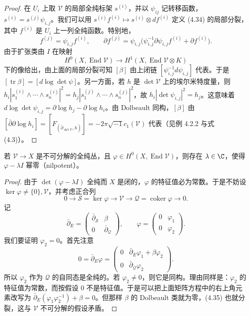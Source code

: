 \begin{proof}
在 $U_i$ 上取 $\mathcal{V}$ 的局部全纯标架 $s^{(i)}$，并以 $\psi_{ij}$ 记转移函数，$s^{(i)}=s^{(j)}\psi_{i,j}$。我们可以用 $s^{(i)}f^{(i)}\mapsto s^{(i)}\otimes df^{(i)}$ 定义 (4.34) 的局部分裂，其中 $f^{(i)}$ 是 $U_i$ 上一列全纯函数。特别地，
\[
f^{(j)}=\psi_{i,j}f^{(i)},\qquad
\partial f^{(j)}=\psi_{i,j}\bigl(\psi^{-1}_{i,j}\partial\psi_{i,j}f^{(i)}+\partial f^{(i)}\bigr).
\]
由于扩张类由 $I$ 在映射
\[
H^0(X,\operatorname{End}\mathcal{V})\longrightarrow H^1(X,\operatorname{End}\mathcal{V}\otimes K)
\]
下的像给出，由上面的局部分裂可知 $[\beta]$ 由上闭链 $[\psi^{-1}_{i,j}d\psi_{i,j}]$ 代表。于是 $[\operatorname{tr}\beta]=[d\log\det\psi]$。另一方面，若 $h$ 是 $\det\mathcal{V}$ 上的埃尔米特度量，则 $h_i|s^{(i)}_1\wedge\cdots\wedge s^{(i)}_n|^2=h_j|s^{(j)}_1\wedge\cdots\wedge s^{(j)}_n|^2$，故 $h_i|\det\psi_{i,j}|^2=h_j$。这意味着 $d\log\det\psi_{i,j}=\partial\log h_j-\partial\log h_i$。由 Dolbeault 同构，$[\beta]$ 由 $[\bar\partial\partial\log h_i]=[F_{(\bar\partial_{\det\mathcal{V}},h)}]=-2\pi\sqrt{-1}c_1(\mathcal{V})$ 代表（见例 4.2.2 与式 (4.3)）。
\end{proof}

\begin{lemma}
若 $\mathcal{V}\to X$ 是不可分解的全纯丛，且 $\varphi\in H^0(X,\operatorname{End}\mathcal{V})$，则存在 $\lambda\in\C$，使得 $\varphi-\lambda I$ 幂零（nilpotent）。
\end{lemma}

\begin{proof}
由于 $\det(\varphi-\lambda I)$ 全纯而 $X$ 是闭的，$\varphi$ 的特征值必为常数。于是不妨设 $\ker\varphi\ne\{0\},\mathcal{V}$，并考虑正合列
\begin{equation}
0\longrightarrow\mathcal{S}=\ker\varphi\longrightarrow\mathcal{V}\longrightarrow\mathcal{Q}=\operatorname{coker}\varphi\longrightarrow 0.
\label{eq:4.35}\tag{4.35}
\end{equation}
记
\[
\bar\partial_E=\begin{pmatrix}\bar\partial_{\mathcal{S}} & \beta\\ 0 & \bar\partial_{\mathcal{Q}}\end{pmatrix},
\qquad
\varphi=\begin{pmatrix}0 & \varphi_1\\ 0 & \varphi_2\end{pmatrix}.
\]
我们要证明 $\varphi_2=0$。首先注意
\[
0=\bar\partial_E\varphi
=\begin{pmatrix}0 & \bar\partial_E\varphi_1+\beta\varphi_2\\ 0 & \bar\partial_{\mathcal{Q}}\varphi_2\end{pmatrix}.
\]
所以 $\varphi_2$ 作为 $\mathcal{Q}$ 的自同态是全纯的。若 $\varphi_2\ne0$，则它是同构。理由同样是：$\varphi_2$ 的特征值为常数，而按假设 $0$ 不是特征值。于是可以把上面矩阵方程中的右上角元素改写为 $\bar\partial_E(\varphi_1\varphi_2^{-1})+\beta=0$。但那样 $\beta$ 的 Dolbeault 类就为零，(4.35) 也就分裂，这与 $\mathcal{V}$ 不可分解的假设矛盾。
\end{proof}

